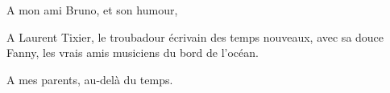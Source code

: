 A mon ami Bruno, et son humour,%

A Laurent Tixier, le troubadour écrivain des temps nouveaux, avec sa douce Fanny, les vrais amis musiciens du bord de l'océan.

A mes parents, au-delà du temps.










